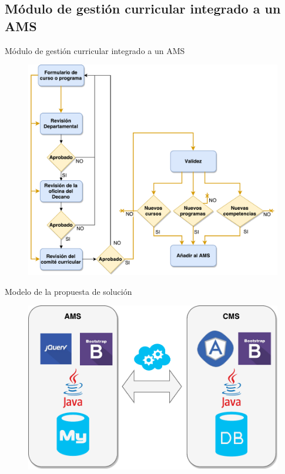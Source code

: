 \documentclass[10pt,xcolor=table ]{beamer}
\begin{document}
\subsection{Módulo de gestión curricular integrado a un AMS}
\begin{frame}{Módulo de gestión curricular integrado a un AMS}
	\begin{figure}
		\centering
	    \includegraphics[scale=0.35]{../Figuras/proposal}
	\end{figure}
\end{frame}


\begin{frame}{Modelo de la propuesta de solución}
	\begin{figure}
		\centering
	    \includegraphics[scale=0.55]{../Figuras/architecture}
	\end{figure}
\end{frame}
\end{document}
